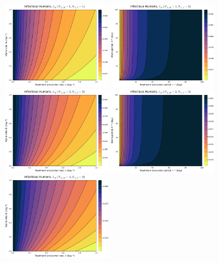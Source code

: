 \documentclass[11pt]{article}
\begin{document}
\begin{figure}[H]
  \centering
  \includegraphics[width=0.4\textwidth]{../../fig/Ih_rates_txh_1x1_uncal.pdf}
  \includegraphics[width=0.4\textwidth]{../../fig/Ih_periods_txh_1x1_uncal.pdf}\\
  \includegraphics[width=0.4\textwidth]{../../fig/Ih_rates_txh_2x2_uncal.pdf}
  \includegraphics[width=0.4\textwidth]{../../fig/Ih_periods_txh_2x2_uncal.pdf}\\
  \includegraphics[width=0.4\textwidth]{../../fig/Ih_rates_txh_4x4_uncal.pdf}

\end{figure}
\end{document}
